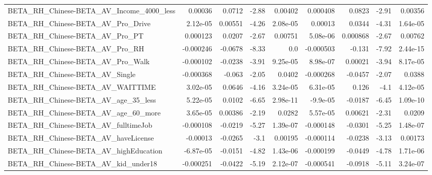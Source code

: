 \begin{tabular}{lrrrrrrrr}
BETA\_RH\_Chinese-BETA\_AV\_Income\_4000\_less           &     0.00036 &       0.0712 &     -2.88 &  0.00402 &   0.000408 &      0.0823 &        -2.91 &       0.00356 \\
BETA\_RH\_Chinese-BETA\_AV\_Pro\_Drive                  &    2.12e-05 &      0.00551 &     -4.26 & 2.08e-05 &    0.00013 &      0.0344 &        -4.31 &      1.64e-05 \\
BETA\_RH\_Chinese-BETA\_AV\_Pro\_PT                     &    0.000123 &       0.0207 &     -2.67 &  0.00751 &   5.08e-06 &    0.000868 &        -2.67 &       0.00762 \\
BETA\_RH\_Chinese-BETA\_AV\_Pro\_RH                     &   -0.000246 &      -0.0678 &     -8.33 &      0.0 &  -0.000503 &      -0.131 &        -7.92 &      2.44e-15 \\
BETA\_RH\_Chinese-BETA\_AV\_Pro\_Walk                   &   -0.000102 &      -0.0238 &     -3.91 & 9.25e-05 &   8.98e-07 &     0.00021 &        -3.94 &      8.17e-05 \\
BETA\_RH\_Chinese-BETA\_AV\_Single                     &   -0.000368 &       -0.063 &     -2.05 &   0.0402 &  -0.000268 &     -0.0457 &        -2.07 &        0.0388 \\
BETA\_RH\_Chinese-BETA\_AV\_WAITTIME                   &    3.02e-05 &       0.0646 &     -4.16 & 3.24e-05 &   6.31e-05 &       0.126 &         -4.1 &      4.12e-05 \\
BETA\_RH\_Chinese-BETA\_AV\_age\_35\_less                &    5.22e-05 &       0.0102 &     -6.65 & 2.98e-11 &   -9.9e-05 &     -0.0187 &        -6.45 &      1.09e-10 \\
BETA\_RH\_Chinese-BETA\_AV\_age\_60\_more                &    3.65e-05 &      0.00386 &     -2.19 &   0.0282 &   5.57e-05 &     0.00621 &        -2.31 &        0.0209 \\
BETA\_RH\_Chinese-BETA\_AV\_fulltimeJob                &   -0.000108 &      -0.0219 &     -5.27 & 1.39e-07 &  -0.000148 &     -0.0301 &        -5.25 &      1.48e-07 \\
BETA\_RH\_Chinese-BETA\_AV\_haveLicense                &    -0.00013 &      -0.0265 &      -3.1 &  0.00195 &  -0.000114 &     -0.0238 &        -3.13 &       0.00173 \\
BETA\_RH\_Chinese-BETA\_AV\_highEducation              &   -6.87e-05 &      -0.0151 &     -4.82 & 1.43e-06 &  -0.000199 &     -0.0449 &        -4.78 &      1.71e-06 \\
BETA\_RH\_Chinese-BETA\_AV\_kid\_under18                &   -0.000251 &      -0.0422 &     -5.19 & 2.12e-07 &  -0.000541 &     -0.0918 &        -5.11 &      3.24e-07 \\

\end{tabular}
